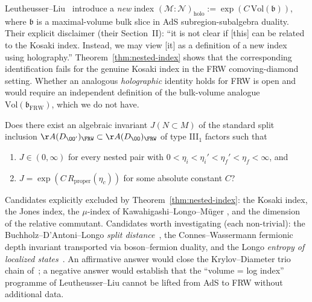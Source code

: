 \begin{remark}\label{rem:holo-redef}
Leutheusser--Liu~\cite{LeutheusserLiu2025} introduce a \emph{new} index
$(\mathcal{M}:\mathcal{N})_{\text{holo}} := \exp(C\,\mathrm{Vol}(\mathfrak{b}))$,
where $\mathfrak{b}$ is a maximal-volume bulk slice in AdS subregion-subalgebra
duality. Their explicit disclaimer (their Section~II): ``it is not clear if
[this] can be related to the Kosaki index. Instead, we may view [it] as a
definition of a new index using holography.'' Theorem~\ref{thm:nested-index}
shows that the corresponding identification fails for the genuine Kosaki index
in the FRW comoving-diamond setting. Whether an analogous \emph{holographic}
identity holds for FRW is open and would require an independent definition of
the bulk-volume analogue $\mathrm{Vol}(\mathfrak{b}_{\text{FRW}})$, which we
do not have.
\end{remark}

\begin{question}
\label{q:non-kosaki-invariant}
Does there exist an algebraic invariant $J(N\subset M)$ of the standard split
inclusion $\AA(D_{\OO'})_\FRW \subset \AA(D_\OO)_\FRW$ of type III$_1$
factors such that
\begin{enumerate}
\item[(a)] $J\in(0,\infty)$ for every nested pair with
$0<\eta_i<\eta_i'<\eta_f'<\eta_f<\infty$, and
\item[(b)] $J = \exp(C\,R_{\text{proper}}(\eta_c))$ for some absolute
constant $C$?
\end{enumerate}
Candidates explicitly excluded by Theorem~\ref{thm:nested-index}: the Kosaki
index, the Jones index, the $\mu$-index of Kawahigashi--Longo--Müger
\cite{KLMmui1999}, and the dimension of the relative commutant. Candidates
worth investigating (each non-trivial): the Buchholz--D'Antoni--Longo
\emph{split distance}~\cite{BuchholzDAntoniLongo1990}, the Connes--Wassermann
fermionic depth invariant transported via boson--fermion duality, and the
Longo \emph{entropy of localized states}~\cite{Longo2020Ent}. An affirmative
answer would close the Krylov--Diameter trio chain
of~\cite{KrylovTrioClose2026}; a negative answer would establish that the
``volume = log index'' programme of Leutheusser--Liu cannot be lifted from AdS
to FRW without additional data.
\end{question}
